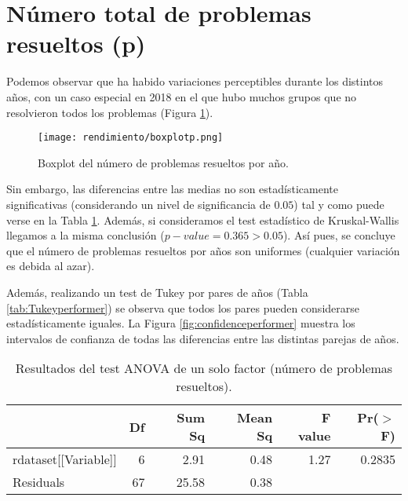 \section{Número total de problemas resueltos (p)}

Podemos observar que ha habido variaciones perceptibles durante los distintos años, con un caso especial en 2018 en el que hubo muchos grupos que no resolvieron todos los problemas (Figura \ref{fig:boxplotperformer}).

\begin{figure}[H]
    \centering
    \texttt{[image: rendimiento/boxplotp.png]}
    \caption{Boxplot del número de problemas resueltos por año.}
    \label{fig:boxplotperformer}
\end{figure}

Sin embargo, las diferencias entre las medias no son estadísticamente significativas (considerando un nivel de significancia de $0.05$) tal y como puede verse en la Tabla \ref{tab:ANOVAperformer}. Además, si consideramos el test estadístico de Kruskal-Wallis llegamos a la misma conclusión ($p-value = 0.365 > 0.05$). Así pues, se concluye que el número de problemas resueltos por años son uniformes (cualquier variación es debida al azar).

Además, realizando un test de Tukey por pares de años (Tabla \ref{tab:Tukeyperformer}) se observa que todos los pares pueden considerarse estadísticamente iguales. La Figura \ref{fig:confidenceperformer} muestra los intervalos de confianza de todas las diferencias entre las distintas parejas de años.

\begin{table}[H]
\centering
\caption{Resultados del test ANOVA de un solo factor (número de problemas resueltos).}
\label{tab:ANOVAperformer}
\begin{tabular}{lrrrrr}
  \hline
 & Df & Sum Sq & Mean Sq & F value & Pr($>$F) \\ 
  \hline
rdataset[[Variable]] & 6 & 2.91 & 0.48 & 1.27 & 0.2835 \\ 
  Residuals            & 67 & 25.58 & 0.38 &  &  \\ 
   \hline
\end{tabular}
\end{table}


